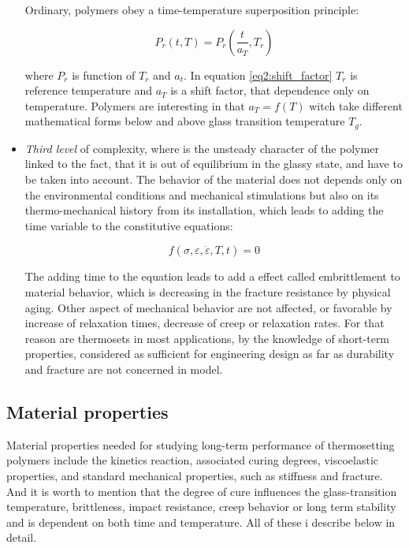 \begin{itemize}
	Ordinary, polymers obey a time-temperature superposition principle:
	
	\begin{equation}\label{eq2:shift_factor}
		P_{r}(t,T) = P_{r} \left(\dfrac{t}{a_{T}}, T_{r}\right)
	\end{equation}
	
	where $P_{r}$ is function of $T_{r}$ and $a_{t}$. In equation \ref{eq2:shift_factor} $T_{r}$ is reference temperature and $a_{T}$ is a shift factor, that dependence only on temperature. Polymers are interesting in that $a_{T} = f(T)$ witch take different mathematical forms below and above glass transition temperature $T_{g}$.
	
	\item
	\textit{Third level} of complexity, where is the unsteady character of the polymer linked to the fact, that it is out of equilibrium in the glassy state, and have to be taken into account. The behavior of the material does not depends only on the environmental conditions and mechanical stimulations but also on its thermo-mechanical history from its installation, which leads to adding the time variable to the constitutive equations:
	
	\begin{equation}
		f(\sigma,\varepsilon,\dot{\varepsilon},T,t)=0
	\end{equation}
	
	The adding time to the equation leads to add a effect called embrittlement to material behavior, which is decreasing in the fracture resistance by physical aging. Other aspect of mechanical behavior are not affected, or favorable by increase of relaxation times, decrease of creep or relaxation rates. For that reason are thermosets in most applications, by the knowledge of short-term properties, considered as sufficient for engineering design as far as durability and fracture are not concerned in model.
	
\end{itemize}


\subsection{Material properties}\label{subsec:mat_proper}
Material properties needed for studying long-term performance of thermosetting polymers include the kinetics reaction, associated curing degrees, viscoelastic properties, and standard mechanical properties, such as stiffness and fracture. And it is worth to mention that the degree of cure influences the glass-transition temperature, brittleness, impact resistance, creep behavior or long term stability and is dependent on both time and temperature. All of these i describe below in detail. 

